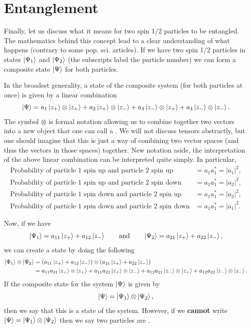 \documentclass{article}
\begin{document}
\section{Entanglement}

Finally, let us discuss what it means for two spin 1/2 particles to be entangled. The mathematics behind this concept lead to a clear understanding of what happens (contrary to some pop. sci. articles).  If we have two spin 1/2 particles in states $\ket{\Psi_1}$ and $\ket{\Psi_2}$ (the subscripts label the particle number) we can form a composite state $\ket{\Psi}$ for both particles.

In the broadest generality, a state of the composite system (for both particles at once) is given by a linear combination 
\[
\ket{\Psi} = a_1 \ket{z_+} \otimes \ket{z_+} + a_2 \ket{z_+} \otimes \ket{z_-} + a_3 \ket{z_-} \otimes \ket{z_+} + a_4 \ket{z_-} \otimes \ket{z_-}.
\]
The symbol $\otimes$ is formal notation allowing us to combine together two vectors into a new object that one can call a .  We will not discuss tensors abstractly, but one should imagine that this is just a way of combining two vector spaces (and thus the vectors in those spaces) together. New notation aside, the interpretation of the above linear combination can be interpreted quite simply. In particular,
\begin{align}
    \textrm{Probability of particle 1 spin up and particle 2 spin up} &= a_1 a_1^* = |a_1|^2,\\
    \textrm{Probability of particle 1 spin up and particle 2 spin down} &= a_1 a_1^* = |a_2|^2,\\
    \textrm{Probability of particle 1 spin down and particle 2 spin up} &= a_1 a_1^* = |a_3|^2,\\
    \textrm{Probability of particle 1 spin down and particle 2 spin down} &= a_1 a_1^* = |a_1|^2.
\end{align}

Now, if we have
\[
\ket{\Psi_1} = a_{11} \ket{z_+} + a_{12} \ket{z_-} \qquad \textrm{and} \qquad \ket{\Psi_2} = a_{21} \ket{z_+} + a_{22} \ket{z_-},
\]
we can create a state by doing the following
\begin{align*}
\ket{\Psi_1}\otimes \ket{\Psi_2} &=  (a_{11} \ket{z_+} + a_{12} \ket{z_-}) \otimes (a_{21} \ket{z_+} + a_{22} \ket{z_-})\\
&= a_{11}a_{21} \ket{z_+} \otimes \ket{z_+} + a_{11} a_{22} \ket{z_+} \otimes \ket{z_-} + a_{12} a_{21} \ket{z_-} \otimes \ket{z_+} + a_{12}a_{22} \ket{z_-} \otimes \ket{z_-}.
\end{align*}
If the composite state for the system $\ket{\Psi}$ is given by 
\begin{equation}
\label{eq:entangled_state}
\ket{\Psi} = \ket{\Psi_1} \otimes \ket{\Psi_2},
\end{equation}
then we say that this is a  state of the system. However, if we \textbf{cannot} write $\ket{\Psi} = \ket{\Psi_1} \otimes \ket{\Psi_2}$ then we say two particles are .  
\end{document}
